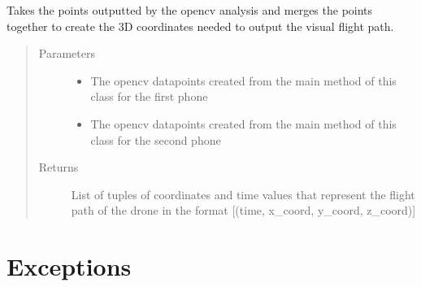 \documentclass[letterpaper,10pt,english]{sphinxmanual}
\begin{document}

\begin{fulllineitems}
\label{\detokenize{index:src.Controllers.OpenCVThreadedController.merge_data_points}}
Takes the points outputted by the opencv analysis and merges the points together to create
the 3D coordinates needed to output the visual flight path.
\begin{quote}\begin{description}
\item[{Parameters}] \leavevmode\begin{itemize}
\item {} 
 \textendash{} The opencv datapoints created from the main method of this class for the first phone

\item {} 
 \textendash{} The opencv datapoints created from the main method of this class for the second phone

\end{itemize}

\item[{Returns}] \leavevmode
List of tuples of coordinates and time values that represent the flight path of the drone in the format {[}(time, x\_coord, y\_coord, z\_coord){]}

\end{description}\end{quote}

\end{fulllineitems}



\chapter{Exceptions}
\label{\detokenize{index:module-src.Controllers.Exceptions}}\label{\detokenize{index:exceptions}}
\end{document}
